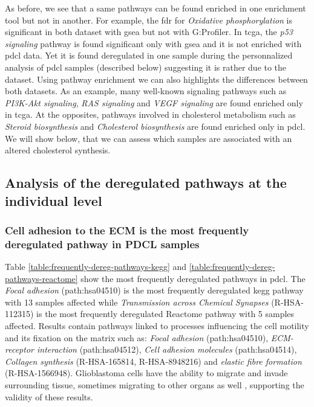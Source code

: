 As before, we see that a same pathways can be found enriched in one enrichment tool but not in another.
For example, the \acrshort{fdr} for \textit{Oxidative phosphorylation} is significant in both dataset with \acrshort{gsea} but not with G:Profiler.
In \acrshort{tcga}, the \textit{p53 signaling} pathway is found significant only with \acrshort{gsea} and it is not enriched with \acrshort{pdcl} data.
Yet it is found deregulated in one sample during the personnalized analysis of \acrshort{pdcl} samples (described below) suggesting it is rather due to the dataset.
Using pathway enrichment we can also highlights the differences between both datasets.
As an example, many well-known signaling pathways such as \textit{PI3K-Akt signaling}, \textit{RAS signaling} and \textit{VEGF signaling} are found enriched only in \acrshort{tcga}.
At the opposites, pathways involved in cholesterol metabolism such as \textit{Steroid biosynthesis} and \textit{Cholesterol biosynthesis} are found enriched only in \acrshort{pdcl}.
We will show below, that we can assess which samples are associated with an altered cholesterol synthesis.

\subsection{Analysis of the deregulated pathways at the individual level}

\subsubsection{Cell adhesion to the ECM is the most frequently deregulated pathway in PDCL samples}

Table \ref*{table:frequently-dereg-pathways-kegg} and \ref*{table:frequently-dereg-pathways-reactome} show the most frequently deregulated pathways in \acrshort{pdcl}.
The \textit{Focal adhesion} (path:hsa04510) is the most frequently deregulated \acrshort{kegg} pathway with 13 samples affected while \textit{Transmission across Chemical Synapses} (R-HSA-112315) is the most frequently deregulated Reactome pathway with 5 samples affected.
Results contain pathways linked to processes influencing the cell motility and its fixation on the matrix such as: \textit{Focal adhesion} (path:hsa04510), \textit{ECM-receptor interaction} (path:hsa04512), \textit{Cell adhesion molecules} (path:hsa04514), \textit{Collagen synthesis} (R-HSA-165814, R-HSA-8948216) and \textit{elastic fibre formation} (R-HSA-1566948).
Glioblastoma cells have the ability to migrate and invade surrounding tissue, sometimes migrating to other organs as well \cite*{Lah2020}, supporting the validity of these results.

